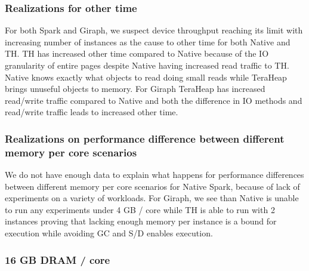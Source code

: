 \subsubsection{Realizations for other time}
For both Spark and Giraph, we suspect device throughput reaching its limit with increasing number of instances as the cause to other time for both Native and TH. TH has increased other time compared to Native because of the IO granularity of entire pages despite Native having increased read traffic to TH. Native knows exactly what objects to read doing small reads while TeraHeap brings unuseful objects to memory. For Giraph TeraHeap has increased read/write traffic compared to Native and both the difference in IO methods and read/write traffic leads to increased other time.

\subsubsection{Realizations on performance difference between different memory per core scenarios}
We do not have enough data to explain what happens for performance differences between different memory per core scenarios for Native Spark, because of lack of experiments on a variety of workloads. For Giraph, we see than Native is unable to run any experiments under 4 GB / core while TH is able to run with 2 instances proving that lacking enough memory per instance is a bound for execution while avoiding GC and S/D enables execution.

\iffalse
\subsubsection{16 GB DRAM / core}

